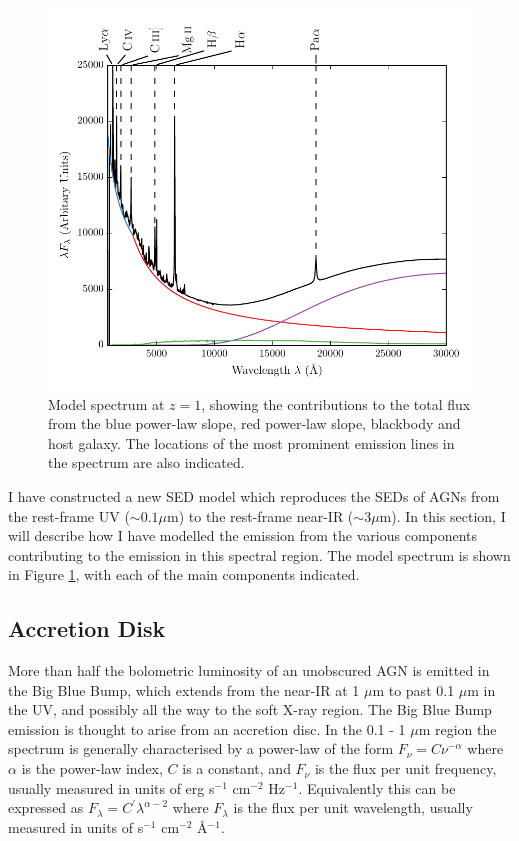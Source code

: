 \begin{figure}
  \centering
  \includegraphics[width=\textwidth]{figures/chapter05/sed_model.pdf}
  \caption{Model spectrum at $z=1$, showing the contributions to the total flux from the blue power-law slope, red power-law slope, blackbody and host galaxy. The locations of the most prominent emission lines in the spectrum are also indicated. }
  \label{fig:modelsed}
\end{figure}

I have constructed a new SED model which reproduces the SEDs of AGNs from the rest-frame UV ($\sim 0.1 \mu$m) to the rest-frame near-IR ($\sim 3 \mu$m). 
In this section, I will describe how I have modelled the emission from the various components contributing to the emission in this spectral region. 
The model spectrum is shown in Figure \ref{fig:modelsed}, with each of the main components indicated. 

\subsection{Accretion Disk}

More than half the bolometric luminosity of an unobscured AGN is emitted in the Big Blue Bump, which extends from the near-IR at 1 $\mu$m to past 0.1 $\mu$m in the UV, and possibly all the way to the soft X-ray region.
The Big Blue Bump emission is thought to arise from an accretion disc. 
In the 0.1 - 1 $\mu$m region the spectrum is generally characterised by a power-law of the form $F_\nu = C\nu^{-\alpha}$ where $\alpha$ is the power-law index, $C$ is a constant, and $F_\nu$ is the flux per unit frequency, usually measured in units of erg s$^{-1}$ cm$^{-2}$ Hz$^{-1}$. 
Equivalently this can be expressed as $F_\lambda = C^\prime\lambda^{\alpha - 2}$ where $F_\lambda$ is the flux per unit wavelength, usually measured in units of s$^{-1}$ cm$^{-2}$ \AA$^{-1}$. 

